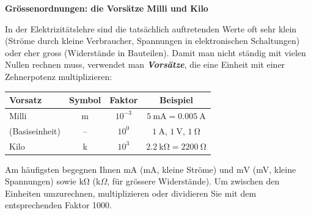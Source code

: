 \documentclass[addpoints,11pt,a4paper]{exam}
\newenvironment{theoriebox}[1][Theorie]{%
  \par\addvspace{10pt}\noindent\textbf{#1}\par\smallskip\noindent
}{%
  \par\addvspace{10pt}
}
\begin{document}
\needspace{10cm}
\begin{theoriebox}[Grössenordnungen: die Vorsätze Milli und Kilo]
In der Elektrizitätslehre sind die tatsächlich auftretenden Werte oft sehr
klein (Ströme durch kleine Verbraucher, Spannungen in elektronischen
Schaltungen) oder eher gross (Widerstände in Bauteilen). Damit man nicht
ständig mit vielen Nullen rechnen muss, verwendet man
\textbf{\emph{Vorsätze}}, die eine Einheit mit einer Zehnerpotenz
multiplizieren:

\begin{center}
\begin{tabular}{lccc}
\toprule
Vorsatz & Symbol & Faktor & Beispiel \\
\midrule
Milli & m & $10^{-3}$ & $\SI{5}{\milli\ampere} = \SI{0.005}{\ampere}$ \\
(Basiseinheit) & -- & $10^{0}$ & $\SI{1}{\ampere}$, $\SI{1}{\volt}$, $\SI{1}{\ohm}$ \\
Kilo & k & $10^{3}$ & $\SI{2.2}{\kilo\ohm} = \SI{2200}{\ohm}$ \\
\bottomrule
\end{tabular}
\end{center}

Am häufigsten begegnen Ihnen $\si{\milli\ampere}$ (mA, kleine Ströme) und
$\si{\milli\volt}$ (mV, kleine Spannungen) sowie $\si{\kilo\ohm}$
(k$\Omega$, für grössere Widerstände). Um zwischen den Einheiten
umzurechnen, multiplizieren oder dividieren Sie mit dem entsprechenden
Faktor 1000.
\end{theoriebox}
\end{document}

